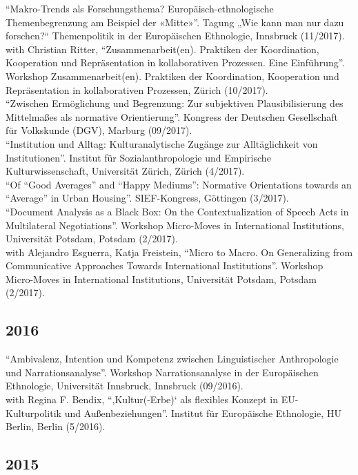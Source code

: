\enquote{Makro-Trends als Forschungsthema? Europäisch-ethnologische Themenbegrenzung am Beispiel der «Mitte»}. Tagung „Wie kann man nur dazu forschen?“ Themenpolitik in der Europäischen Ethnologie, Innsbruck (11/2017).\\[.25cm]with Christian Ritter, \enquote{Zusammenarbeit(en). Praktiken der Koordination, Kooperation und Repräsentation in kollaborativen Prozessen. Eine Einführung}. Workshop Zusammenarbeit(en). Praktiken der Koordination, Kooperation und Repräsentation in kollaborativen Prozessen, Zürich (10/2017).\\[.25cm]\enquote{Zwischen Ermöglichung und Begrenzung: Zur subjektiven Plausibilisierung des Mittelmaßes als normative Orientierung}. Kongress der Deutschen Gesellschaft für Volkskunde (DGV), Marburg (09/2017).\\[.25cm]\enquote{Institution und Alltag: Kulturanalytische Zugänge zur Alltäglichkeit von Institutionen}. Institut für Sozialanthropologie und Empirische Kulturwissenschaft, Universität Zürich, Zürich (4/2017).\\[.25cm]\enquote{Of “Good Averages” and “Happy Mediums”: Normative Orientations towards an “Average” in Urban Housing}. SIEF-Kongress, Göttingen (3/2017).\\[.25cm]\enquote{Document Analysis as a Black Box: On the Contextualization of Speech Acts in Multilateral Negotiations}. Workshop Micro-Moves in International Institutions, Universität Potsdam, Potsdam (2/2017).\\[.25cm]with Alejandro Esguerra, Katja Freistein, \enquote{Micro to Macro. On Generalizing from Communicative Approaches Towards International Institutions}. Workshop Micro-Moves in International Institutions, Universität Potsdam, Potsdam (2/2017).\subsection*{2016}
\enquote{Ambivalenz, Intention und Kompetenz zwischen Linguistischer Anthropologie und Narrationsanalyse}. Workshop Narrationsanalyse in der Europäischen Ethnologie, Universität Innsbruck, Innsbruck (09/2016).\\[.25cm]with Regina F. Bendix, \enquote{,Kultur(-Erbe)‘ als flexibles Konzept in EU-Kulturpolitik und Außenbeziehungen}. Institut für Europäische Ethnologie, HU Berlin, Berlin (5/2016).\subsection*{2015}

